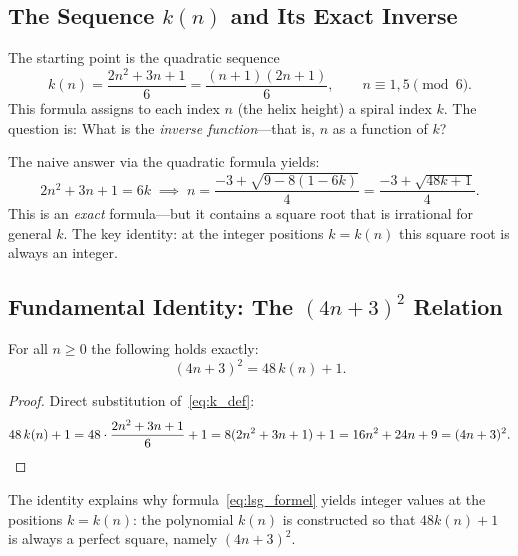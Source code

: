 \subsection{The Sequence \texorpdfstring{$k(n)$}{k(n)} and Its Exact Inverse}
\label{subsec:inverse}

The starting point is the quadratic sequence
\begin{equation}\label{eq:k_def}
  k(n) = \frac{2n^2 + 3n + 1}{6} = \frac{(n+1)(2n+1)}{6},
  \qquad n \equiv 1, 5 \pmod{6}.
\end{equation}
This formula assigns to each index $n$ (the helix height) a
spiral index $k$. The question is: What is the
\emph{inverse function}---that is, $n$ as a function of $k$?

The naive answer via the quadratic formula yields:
\begin{equation}\label{eq:lsg_formel}
  2n^2 + 3n + 1 = 6k
  \;\implies\;
  n = \frac{-3 + \sqrt{9 - 8(1-6k)}}{4}
    = \frac{-3 + \sqrt{48k + 1}}{4}.
\end{equation}
This is an \emph{exact} formula---but it contains a square root
that is irrational for general $k$. The key identity:
at the integer positions $k = k(n)$ this square root is always
an integer.

\subsection{Fundamental Identity: The \texorpdfstring{$(4n+3)^2$}{(4n+3)^2} Relation}
\label{subsec:fundamentale_identitaet}

\begin{satz}\label{satz:fundamental}
For all $n \geq 0$ the following holds exactly:
\begin{equation}\label{eq:fundamental}
  \boxed{(4n+3)^2 = 48\,k(n) + 1.}
\end{equation}
\end{satz}

\begin{proof}
Direct substitution of~\eqref{eq:k_def}:
\[
  48\,k(n) + 1
  = 48\cdot\frac{2n^2 + 3n + 1}{6} + 1
  = 8(2n^2 + 3n + 1) + 1
  = 16n^2 + 24n + 9
  = (4n+3)^2. \qedhere
\]
\end{proof}

\noindent
The identity explains why formula~\eqref{eq:lsg_formel}
yields integer values at the positions $k = k(n)$: the polynomial $k(n)$
is constructed so that $48k(n)+1$ is always a perfect square,
namely $(4n+3)^2$.

